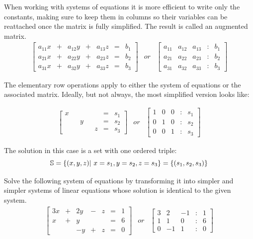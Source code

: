When working with systems of equations it is more efficient to write only the constants, making sure to keep them in columns so their variables can be reattached once the matrix is fully simplified. The result is called an augmented matrix.  
     \[\begin{array}{lcr}
        \left[ \begin{array}{ccccccc}
 	      a_{11}x & + & a_{12}y & + & a_{13}z & = & b_{1} \\
 	      a_{21}x & + & a_{22}y & + & a_{23}z & = & b_{2} \\
 	      a_{31}x & + & a_{32}y & + & a_{33}z & = & b_{3}
 	\end{array} \right] & or & 
 	   \left[ \begin{array}{ccccc}
 	   a_{11} &  a_{12} &  a_{13} & : & b_{1} \\
 	   a_{21} &  a_{22} &  a_{23} & : & b_{2}  \\
 	   a_{31} &  a_{32} &  a_{33} & : & b_{3}
 	  \end{array}  \right]
 	\end{array} \] 
 
  The elementary row operations apply to either the system of equations or the associated matrix.  Ideally, but not always, the most simplified version looks like: 

 
 \[\begin{array}{lcr}
 \left[ \begin{array}{ccccccc}
  x &  &    &  &   & = & s_{1} \\
    &  &  y &  &   & = & s_{2} \\
    &  &    &  & z & = & s_{3}
 \end{array} \right] & or & 
 \left[ \begin{array}{ccccc}
 1 &  0 &  0 & : & s_{1} \\
 0 &  1 &  0 & : & s_{2}  \\
 0 &  0 &  1 & : & s_{3}
 \end{array}  \right]
 \end{array} \] 
 
The solution in this case is a set with one ordered triple: \[ \mathbb{S} = \{ ({x},{y},{z})|\    x =s_1,y=s_2,z=s_3 \} = \{ ({s_1},{s_2},{s_3}) \}\]


 \begin{myexa}[\bd{a}]
 	Solve the following system of equations by transforming it into simpler and simpler systems of linear equations whose solution is identical to the given system.
 	 \[\begin{array}{lcr}
 	 \left[ \begin{array}{ccccccc}
 	 3x & + & 2y & - & z & = & 1 \\
 	 x & + & y &  &  & = & 6 \\
 	 &  & -y & + & z & = & 0
 	 \end{array} \right] & or & 
 	 \left[ \begin{array}{ccccc}
 	 3 &  2 &  -1 & : & 1 \\
 	1 &  1 &  0 & : & 6  \\
 	0 &  -1 &  1 & : & 0
 	 \end{array}  \right]
 	 \end{array} \] 
 \end{myexa} 
 
